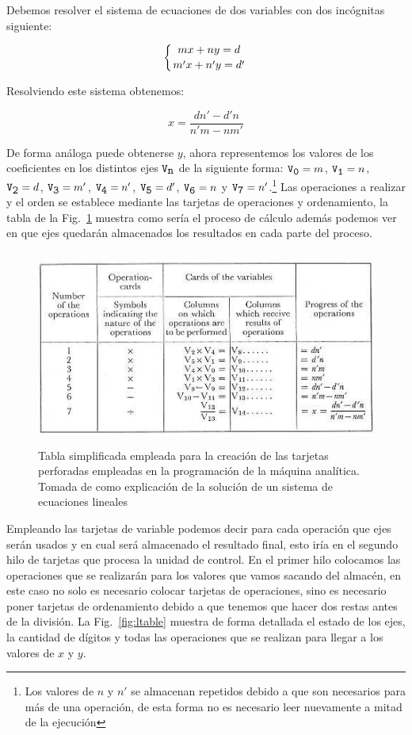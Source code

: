 \documentclass[runningheads,a4paper]{llncs}
\begin{document}
Debemos resolver el sistema de ecuaciones de dos variables con dos incógnitas siguiente:

\begin{equation}
	\left\{
		mx + ny = d \atop
		m'x + n'y = d'
	\right.
\end{equation} 

Resolviendo este sistema obtenemos:

\begin{equation}
	x = \frac{dn' - d'n}{n'm - nm'}
\end{equation}

De forma análoga puede obtenerse $y$, ahora representemos los valores de los coeficientes en los distintos ejes $\verb*|V|_{\verb*|n|}$ de la siguiente forma: $\verb*|V|_{\verb*|0|} = m$, $\verb*|V|_{\verb*|1|} = n$, $\verb*|V|_{\verb*|2|} = d$, $\verb*|V|_{\verb*|3|} = m'$, $\verb*|V|_{\verb*|4|} = n'$, $\verb*|V|_{\verb*|5|} = d'$, $\verb*|V|_{\verb*|6|} = n$ y $\verb*|V|_{\verb*|7|} = n'$.\footnote{Los valores de $n$ y $n'$ se almacenan repetidos debido a que son necesarios para más de una operación, de esta forma no es necesario leer nuevamente a mitad de la ejecución} Las operaciones a realizar y el orden se establece mediante las
tarjetas de operaciones y ordenamiento, la tabla de la Fig.~\ref{fig:stable} muestra como sería el proceso de cálculo
además podemos ver en que ejes quedarán almacenados los resultados en cada parte del proceso.

\begin{figure}
	\centering
	\includegraphics[height=6.4cm]{imgs/stable}
	\caption{Tabla simplificada empleada para la creación de las tarjetas perforadas empleadas en la programación de la máquina analítica. Tomada de \cite{lovelace} como explicación de la solución de un sistema de ecuaciones lineales}
	\label{fig:stable}
\end{figure}

Empleando las tarjetas de variable podemos decir para cada operación que ejes serán usados y en cual será almacenado el resultado final, esto iría en el segundo hilo de tarjetas que procesa la unidad de control. En el primer hilo colocamos 
las operaciones que se realizarán para los valores que vamos sacando del almacén, en este caso no solo es necesario colocar tarjetas de operaciones, sino es necesario poner tarjetas de ordenamiento debido a que tenemos que hacer dos restas antes de la división. La Fig.~\ref{fig:ltable} muestra de forma detallada el estado de los ejes, la cantidad 
de dígitos y todas las operaciones que se realizan para llegar a los valores de $x$ y $y$.
\end{document}
